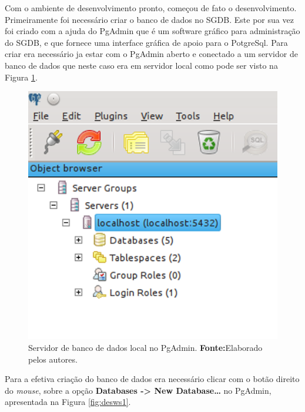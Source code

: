 
	
	\par Com o ambiente de desenvolvimento pronto, começou de fato o
desenvolvimento. Primeiramente foi necessário criar o banco de dados no SGDB.
Este por sua vez foi criado com a ajuda do PgAdmin que é um software gráfico
para administração do SGDB, e que fornece uma interface gráfica de apoio para o
PotgreSql. Para criar era necessário ja estar com o PgAdmin aberto e conectado
a um servidor de banco de dados que neste caso era em servidor local como pode
ser visto na Figura \ref{fig:desws}.

	\begin{figure}[h!]
		\centerline{\includegraphics[scale=1]{./imagens/2_q_metodologico/4_procedimentos_resultados/43_webservice/432_desenvolvimento/desws.png}}
		\caption[Servidor de banco de dados local no PgAdmin]{Servidor de banco de
		dados local no PgAdmin.
			\textbf{Fonte:}Elaborado pelos autores.}
		\label{fig:desws}
	\end{figure}
	
	\pagebreak
	
	\par Para a efetiva criação do banco de dados era necessário clicar com o
botão direito do \textit{mouse}, sobre a opção \textbf{Databases -> New
Database\ldots} no PgAdmin, apresentada na Figura \ref{fig:desws1}.

